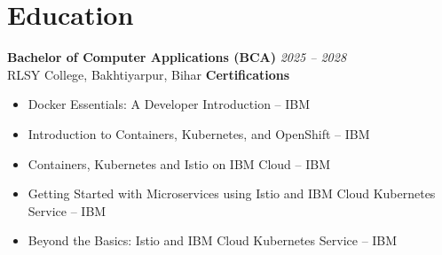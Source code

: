 \documentclass[10pt, letterpaper]{article}
\begin{document}
\section{Education}
\textbf{Bachelor of Computer Applications (BCA)} \hfill \textit{2025 -- 2028} \\
RLSY College, Bakhtiyarpur, Bihar
\vspace{6pt}
\textbf{Certifications} \\
\begin{itemize}[noitemsep, topsep=2pt, leftmargin=1.2em]
 \item Docker Essentials: A Developer Introduction -- IBM
 \item Introduction to Containers, Kubernetes, and OpenShift -- IBM
 \item Containers, Kubernetes and Istio on IBM Cloud -- IBM
 \item Getting Started with Microservices using Istio and IBM Cloud Kubernetes Service -- IBM
 \item Beyond the Basics: Istio and IBM Cloud Kubernetes Service -- IBM
\end{itemize}
\end{document}
